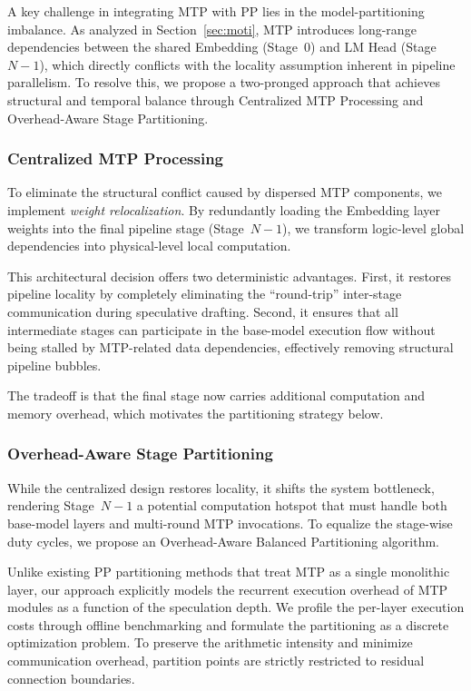 \documentclass[12pt,a4paper]{article}
\newcommand{\modelimb}{model-partitioning imbalance\xspace}
\newcommand{\Centralmtp}{Centralized MTP Processing\xspace}
\newcommand{\Overheadpartition}{Overhead-Aware Stage Partitioning\xspace}
\begin{document}
A key challenge in integrating MTP with PP lies in the \modelimb.
As analyzed in Section~\ref{sec:moti}, MTP introduces long-range dependencies between the shared Embedding (Stage~0) and LM Head (Stage~$N{-}1$), which directly conflicts with the locality assumption inherent in pipeline parallelism.
To resolve this, we propose a two-pronged approach that achieves structural and temporal balance through \Centralmtp and \Overheadpartition.

\subsubsection{\Centralmtp}

To eliminate the structural conflict caused by dispersed MTP components, we implement \textit{weight relocalization}.
By redundantly loading the Embedding layer weights into the final pipeline stage (Stage~$N{-}1$), we transform logic-level global dependencies into physical-level local computation.

This architectural decision offers two deterministic advantages.
First, it restores pipeline locality by completely eliminating the ``round-trip'' inter-stage communication during speculative drafting.
Second, it ensures that all intermediate stages can participate in the base-model execution flow without being stalled by MTP-related data dependencies, effectively removing structural pipeline bubbles.

The tradeoff is that the final stage now carries additional computation and memory overhead, which motivates the partitioning strategy below.

\subsubsection{\Overheadpartition}

While the centralized design restores locality, it shifts the system bottleneck, rendering Stage~$N{-}1$ a potential computation hotspot that must handle both base-model layers and multi-round MTP invocations.
To equalize the stage-wise duty cycles, we propose an Overhead-Aware Balanced Partitioning algorithm.

Unlike existing PP partitioning methods that treat MTP as a single monolithic layer, our approach explicitly models the recurrent execution overhead of MTP modules as a function of the speculation depth.
We profile the per-layer execution costs through offline benchmarking and formulate the partitioning as a discrete optimization problem.
To preserve the arithmetic intensity and minimize communication overhead, partition points are strictly restricted to residual connection boundaries.
\end{document}
